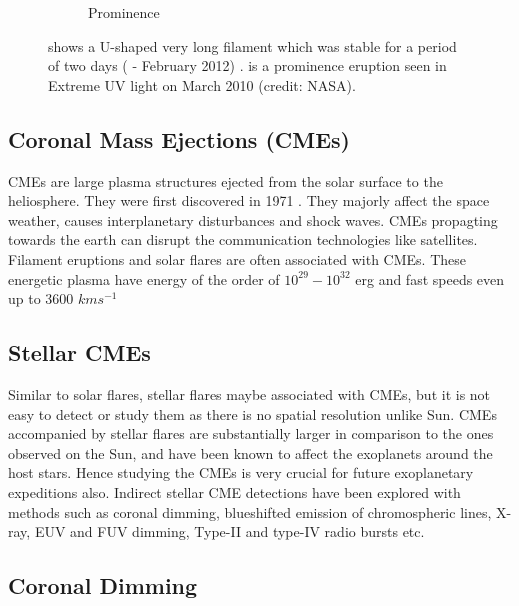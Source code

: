 \message{ !name(main.tex)}\documentclass[12pt]{article}
\begin{document}
\begin{figure}
\begin{subfigure}[b]{0.5\textwidth}
         \caption{Prominence}
         \label{fig:prominence}
     \end{subfigure}
     \label{fig:filament_prominence}
     \caption{ shows a U-shaped very long filament which was stable for a period of two days ( -  February 2012) .  is a prominence eruption seen in Extreme UV light on  March 2010 (credit: NASA).}
\end{figure}

\subsection{Coronal Mass Ejections (CMEs)}

CMEs are large plasma structures ejected from the solar surface to the heliosphere. They were first discovered in 1971 \citep{Gopalswamy2016-nm}. They majorly affect the space weather, causes interplanetary disturbances and shock waves. CMEs propagting towards the earth can disrupt the communication technologies like satellites. Filament eruptions and solar flares are often associated with CMEs. These energetic plasma have energy of the order of $10^{29} - 10^{32}$ erg and fast speeds even up to 3600 $kms^{-1}$

\subsection{Stellar CMEs}

Similar to solar flares, stellar flares maybe associated with CMEs, but it is not easy to detect or study them as there is no spatial resolution unlike Sun. CMEs accompanied by stellar flares are substantially larger in comparison to the ones observed on the Sun, and have been known to affect the exoplanets around the host stars. Hence studying the CMEs is very crucial for future exoplanetary expeditions also. Indirect stellar CME detections have been explored with methods such as coronal dimming, blueshifted emission of chromospheric lines, X-ray, EUV and FUV dimming, Type-II and type-IV radio bursts etc.

\subsection{Coronal Dimming}
\end{document}
